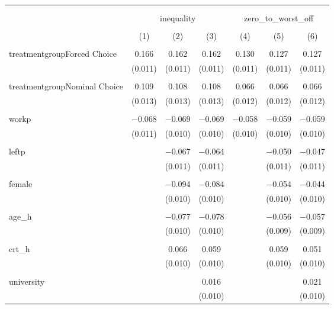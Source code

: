 
\begin{table}[!htbp] \centering 
  \caption{} 
  \label{} 
\begin{tabular}{@{\extracolsep{5pt}}lcccccc} 
\\[-1.8ex]\hline 
\hline \\[-1.8ex] 
\\[-1.8ex] & \multicolumn{3}{c}{inequality} & \multicolumn{3}{c}{zero\_to\_worst\_off} \\ 
\\[-1.8ex] & (1) & (2) & (3) & (4) & (5) & (6)\\ 
\hline \\[-1.8ex] 
 treatmentgroupForced Choice & 0.166 & 0.162 & 0.162 & 0.130 & 0.127 & 0.127 \\ 
  & (0.011) & (0.011) & (0.011) & (0.011) & (0.011) & (0.011) \\ 
  & & & & & & \\ 
 treatmentgroupNominal Choice & 0.109 & 0.108 & 0.108 & 0.066 & 0.066 & 0.066 \\ 
  & (0.013) & (0.013) & (0.013) & (0.012) & (0.012) & (0.012) \\ 
  & & & & & & \\ 
 workp & $-$0.068 & $-$0.069 & $-$0.069 & $-$0.058 & $-$0.059 & $-$0.059 \\ 
  & (0.011) & (0.010) & (0.010) & (0.010) & (0.010) & (0.010) \\ 
  & & & & & & \\ 
 leftp &  & $-$0.067 & $-$0.064 &  & $-$0.050 & $-$0.047 \\ 
  &  & (0.011) & (0.011) &  & (0.011) & (0.011) \\ 
  & & & & & & \\ 
 female &  & $-$0.094 & $-$0.084 &  & $-$0.054 & $-$0.044 \\ 
  &  & (0.010) & (0.010) &  & (0.010) & (0.010) \\ 
  & & & & & & \\ 
 age\_h &  & $-$0.077 & $-$0.078 &  & $-$0.056 & $-$0.057 \\ 
  &  & (0.010) & (0.010) &  & (0.009) & (0.009) \\ 
  & & & & & & \\ 
 crt\_h &  & 0.066 & 0.059 &  & 0.059 & 0.051 \\ 
  &  & (0.010) & (0.010) &  & (0.010) & (0.010) \\ 
  & & & & & & \\ 
 university &  &  & 0.016 &  &  & 0.021 \\ 
  &  &  & (0.010) &  &  & (0.010) \\ 

\end{tabular}
\end{table}
